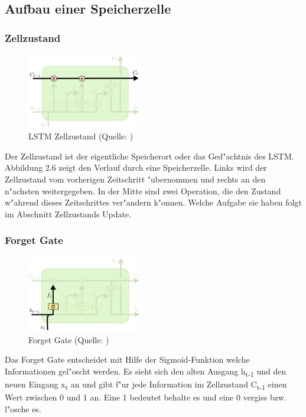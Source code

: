 {\subsection{Aufbau einer Speicherzelle}
\subsubsection{Zellzustand}
\begin{figure}
  \vspace{-30pt}
  \begin{center}
    \includegraphics[width=0.45\textwidth]{pictures/LSTM3-C-line.png}
  \end{center}
  \vspace{-20pt}
  \caption[LSTM Zellzustand]{LSTM Zellzustand (Quelle: \cite{OlahImg})}
\vspace{-10pt}
\end{figure}
Der Zellzustand ist der eigentliche Speicherort oder das Ged"achtnis des LSTM. Abbildung 2.6 zeigt den Verlauf durch eine Speicherzelle. Links wird der Zellzustand vom vorherigen Zeitschritt "ubernommen und rechts an den n"achsten weitergegeben. In der Mitte sind zwei Operation, die den Zustand w"ahrend dieses Zeitschrittes ver"andern k"onnen. Welche Aufgabe sie haben folgt im Abschnitt Zellzustands Update.

\subsubsection{Forget Gate}
\begin{figure}
  \vspace{-30pt}
  \begin{center}
    \includegraphics[width=0.45\textwidth]{pictures/LSTM3-focus-f_cut.png}
  \end{center}
  \vspace{-20pt}
  \caption[LSTM: Forget Gate]{Forget Gate (Quelle: \cite{OlahImg})}
\vspace{-10pt}
\end{figure}
Das Forget Gate entscheidet mit Hilfe der Sigmoid-Funktion welche Informationen gel"oscht werden. Es sieht sich den alten Ausgang h\textsubscript{t-1} und den neuen Eingang x\textsubscript{t} an und gibt f"ur jede Information im Zellzustand C\textsubscript{t-1} einen Wert zwischen 0 und 1 an. Eine 1 bedeutet behalte es und eine 0 vergiss bzw. l"osche es.

}
